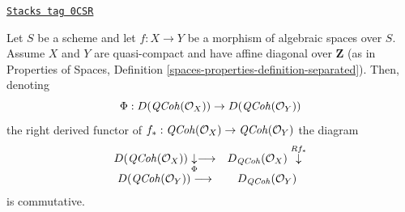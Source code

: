 \begin{lemma}
\label{spaces-perfect-lemma-direct-image-coherator}
\href{https://stacks.math.columbia.edu/tag/0CSR}{\texttt{Stacks tag 0CSR}}

Let $S$ be a scheme and let $f : X \to Y$ be a morphism of algebraic
spaces over $S$. Assume $X$ and $Y$ are quasi-compact and have affine diagonal
over $\mathbf{Z}$ (as in Properties of Spaces, Definition
\ref{spaces-properties-definition-separated}). Then, denoting
$$
\Phi : D(\mathit{QCoh}(\mathcal{O}_X)) \to D(\mathit{QCoh}(\mathcal{O}_Y))
$$
the right derived functor of
$f_* : \mathit{QCoh}(\mathcal{O}_X) \to \mathit{QCoh}(\mathcal{O}_Y)$
the diagram
$$
\begin{array}{cc}D(\mathit{QCoh}(\mathcal{O}_X)) \underset{\Phi}{\downarrow}\longrightarrow & D_{\mathit{QCoh}}(\mathcal{O}_X) \overset{Rf_*}{\downarrow} \\ D(\mathit{QCoh}(\mathcal{O}_Y)) \longrightarrow & D_{\mathit{QCoh}}(\mathcal{O}_Y)\end{array}
$$
is commutative.
\end{lemma}

